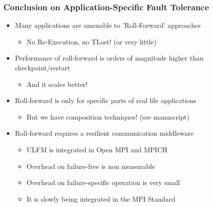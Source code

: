 \begin{frame}
  \frametitle{Conclusion on Application-Specific Fault Tolerance}

  \begin{itemize}
  \item Many applications are amenable to 'Roll-Forward' approaches
    \begin{itemize}
    \item No Re-Execution, no TLost! (or very little)
    \end{itemize}
  \item Performance of roll-forward is orders of magnitude higher than checkpoint/restart
    \begin{itemize}
    \item And it scales better!
    \end{itemize}
  \item Roll-forward is only for specific parts of real life applications
    \begin{itemize}
    \item But we have composition techniques! (see manuscript)
    \end{itemize}
  \item Roll-forward requires a resilient communication middleware
    \begin{itemize}
    \item ULFM is integrated in Open MPI and MPICH
    \item Overhead on failure-free is non measurable
    \item Overhead on failure-specific operation is very small
    \item It is slowly being integrated in the MPI Standard
    \end{itemize}
  \end{itemize}
  
\end{frame}
